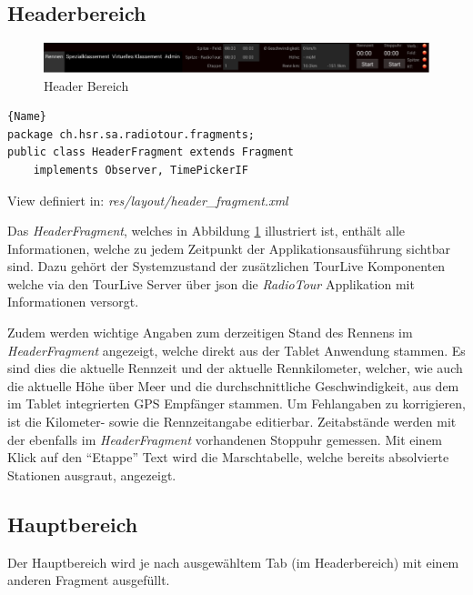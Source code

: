 \subsection{Headerbereich}

\begin{figure}[h!]
\caption{Header Bereich}
\label{fig:headerbereich}
\centering
\includegraphics[scale=0.8]{07anhang/images/dev_header.png}
\end{figure}


\begin{lstlisting}{Name}
package ch.hsr.sa.radiotour.fragments;
public class HeaderFragment extends Fragment
	implements Observer, TimePickerIF
\end{lstlisting}

View definiert in:
\textit{res/layout/header\_fragment.xml}

Das \textit{HeaderFragment}, welches in Abbildung \ref{fig:headerbereich} illustriert ist, enthält alle Informationen, welche zu jedem Zeitpunkt der Applikationsausführung sichtbar sind. Dazu gehört der Systemzustand der zusätzlichen TourLive Komponenten welche via den TourLive Server über \gls{json} die \textit{RadioTour} Applikation mit Informationen versorgt.

Zudem werden wichtige Angaben zum derzeitigen Stand des Rennens im \textit{HeaderFragment} angezeigt, welche direkt aus der Tablet Anwendung stammen. Es sind dies die aktuelle Rennzeit und der aktuelle Rennkilometer, welcher, wie auch die aktuelle Höhe über Meer und die durchschnittliche Geschwindigkeit, aus dem im Tablet integrierten GPS Empfänger stammen. Um Fehlangaben zu korrigieren, ist die Kilometer- sowie die Rennzeitangabe editierbar.
Zeitabstände werden mit der ebenfalls im \textit{HeaderFragment} vorhandenen Stoppuhr gemessen. 
Mit einem Klick auf den "`Etappe"' Text wird die Marschtabelle, welche bereits absolvierte Stationen ausgraut, angezeigt.

\subsection{Hauptbereich}
Der Hauptbereich wird je nach ausgewähltem Tab (im Headerbereich) mit einem anderen Fragment ausgefüllt.
\\

